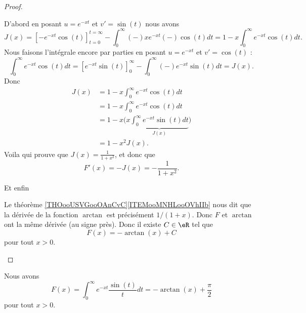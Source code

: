 \begin{proof}
\begin{subproof}
            D'abord en posant \( u= e^{-xt}\) et \( v'=\sin(t)\) nous avons
            \begin{equation}
                J(x)=\left[ - e^{-xt}\cos(t) \right]_{t=0}^{t=\infty}-\int_0^{\infty}(-)x e^{-xt}(-)\cos(t)dt=1-x\int_0^{\infty} e^{-xt}\cos(t)dt.
            \end{equation}
            Nous faisons l'intégrale encore par parties en posant \( u= e^{-xt}\) et \( v'=\cos(t)\) :
            \begin{equation}
                \int_0^{\infty} e^{-xt}\cos(t)dt=\left[  e^{-xt}\sin(t) \right]_0^{\infty}-\int_0^{\infty}(-) e^{-xt}\sin(t)dt=J(x).
            \end{equation}
            Donc
            \begin{subequations}
                \begin{align}
                    J(x)&=1-x\int_0^{\infty} e^{-xt}\cos(t)dt\\
                    &=1-x\int_0^{\infty} e^{-xt}\cos(t)dt\\
                    &=1-x\Big( x\underbrace{\int_0^{\infty} e^{-xt}\sin(t)dt}_{J(x)} \Big)\\
                    &=1-x^2J(x).
                \end{align}
            \end{subequations}
            Voila qui prouve que \( J(x)=\frac{1}{ 1+x^2 }\), et donc que
            \begin{equation}
                F'(x)=-J(x)=-\frac{1}{ 1+x^2 }.
            \end{equation}
            
        \item[Et enfin]

            Le théorème \ref{THOooUSVGooOAnCvC}\ref{ITEMooMNHLooOVhIIb} nous dit que la dérivée de la fonction \( \arctan\) est précisément \( 1/(1+x)\). Donc \( F\) et \( \arctan\) ont la même dérivée (au signe près). Donc il existe \( C\in \eR\) tel que
            \begin{equation}
                F(x)=-\arctan(x)+C
            \end{equation}
            pour tout \( x>0\).

    \end{subproof}
\end{proof}

\begin{lemma}       \label{LEMooEOYHooVIMCCa}
    Nous avons
    \begin{equation}
        F(x)=\int_0^{\infty} e^{-xt}\frac{ \sin(t) }{ t }dt=-\arctan(x)+\frac{ \pi }{2}
    \end{equation}
    pour tout \( x>0\).
\end{lemma}

